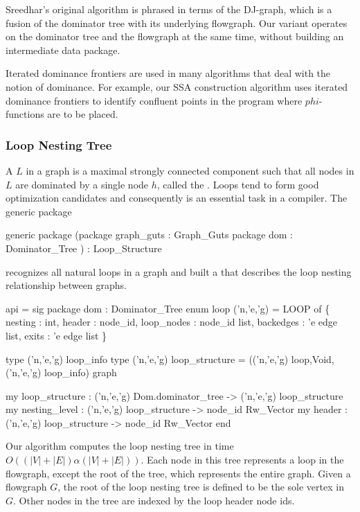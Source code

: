 Sreedhar's original algorithm is phrased in terms of the
DJ-graph, which is a fusion of the dominator tree
with its underlying flowgraph.  Our variant operates on the
dominator tree and the flowgraph at the same time, without
building an intermediate data package.  

Iterated dominance frontiers are used
in many algorithms that deal with the notion of dominance.
For example, our SSA construction algorithm uses iterated
dominance frontiers to identify confluent points in the program
where $phi$-functions are to be placed.

\subsubsection{Loop Nesting Tree}

A  $L$ in a graph is a maximal 
strongly connected component 
such that all nodes in $L$ are dominated by a single node $h$, called
the .  Loops tend to form good optimization candidates
and consequently  is an essential task in a compiler.
The generic package 
\begin{SML}
 generic package  
  (package graph_guts : Graph_Guts
   package dom       : Dominator_Tree
  ) : Loop_Structure 
\end{SML}
recognizes all natural loops in a graph and built a 
that describes the loop nesting relationship between graphs.

\begin{SML}
 api  = sig
   package dom : Dominator_Tree
   enum loop ('n,'e,'g) =
      LOOP of \{ nesting    : int,
                header     : node_id,
                loop_nodes : node_id list,
                backedges  : 'e edge list,
                exits      : 'e edge list
              \}

   type ('n,'e,'g) loop_info
   type ('n,'e,'g) loop_structure = (('n,'e,'g) loop,Void, ('n,'e,'g) loop_info) graph

   my loop_structure : ('n,'e,'g) Dom.dominator_tree -> ('n,'e,'g) loop_structure
   my nesting_level : ('n,'e,'g) loop_structure -> node_id Rw_Vector
   my header        : ('n,'e,'g) loop_structure -> node_id Rw_Vector
 end
\end{SML}

Our algorithm computes the loop nesting tree in time 
$O((|V|+|E|)\alpha(|V|+|E|))$.
Each node in this tree represents a loop in the flowgraph, except the
root of the tree, which represents the entire graph.    
Given a flowgraph $G$, the root
of the loop nesting tree is defined to be the sole vertex in 
 $G$.  Other nodes in the tree
are indexed by the loop header node ids.

